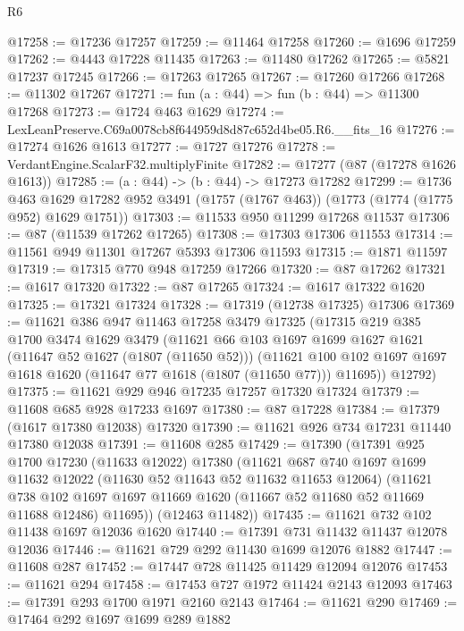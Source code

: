\begin{lexlean}{R6}
\begin{coremodule}
@17258 := @17236 @17257
@17259 := @11464 @17258
@17260 := @1696 @17259
@17262 := @4443 @17228 @11435
@17263 := @11480 @17262
@17265 := @5821 @17237 @17245
@17266 := @17263 @17265
@17267 := @17260 @17266
@17268 := @11302 @17267
@17271 := fun (a : @44) => fun (b : @44) => @11300 @17268
@17273 := @1724 @463 @1629
@17274 := LexLeanPreserve.C69a0078cb8f644959d8d87c652d4be05.R6.__fits_16
@17276 := @17274 @1626 @1613
@17277 := @1727 @17276
@17278 := VerdantEngine.ScalarF32.multiplyFinite
@17282 := @17277 (@87 (@17278 @1626 @1613))
@17285 := (a : @44) -> (b : @44) -> @17273 @17282
@17299 := @1736
    @463
    @1629
    @17282
    @952
    @3491
    (@1757 (@1767 @463))
    (@1773 (@1774 (@1775 @952) @1629 @1751))
@17303 := @11533 @950 @11299 @17268 @11537
@17306 := @87 (@11539 @17262 @17265)
@17308 := @17303 @17306 @11553
@17314 := @11561 @949 @11301 @17267 @5393 @17306 @11593
@17315 := @1871 @11597
@17319 := @17315 @770 @948 @17259 @17266
@17320 := @87 @17262
@17321 := @1617 @17320
@17322 := @87 @17265
@17324 := @1617 @17322 @1620
@17325 := @17321 @17324
@17328 := @17319 (@12738 @17325) @17306
@17369 := @11621
    @386
    @947
    @11463
    @17258
    @3479
    @17325
    (@17315
      @219
      @385
      @1700
      @3474
      @1629
      @3479
      (@11621
        @66
        @103
        @1697
        @1699
        @1627
        @1621
        (@11647 @52 @1627 (@1807 (@11650 @52)))
        (@11621 @100 @102 @1697 @1697 @1618 @1620 (@11647 @77 @1618 (@1807 (@11650 @77))) @11695))
      @12792)
@17375 := @11621 @929 @946 @17235 @17257 @17320 @17324
@17379 := @11608 @685 @928 @17233 @1697
@17380 := @87 @17228
@17384 := @17379 (@1617 @17380 @12038) @17320
@17390 := @11621 @926 @734 @17231 @11440 @17380 @12038
@17391 := @11608 @285
@17429 := @17390
    (@17391
      @925
      @1700
      @17230
      (@11633 @12022)
      @17380
      (@11621
        @687
        @740
        @1697
        @1699
        @11632
        @12022
        (@11630 @52 @11643 @52 @11632 @11653 @12064)
        (@11621
          @738
          @102
          @1697
          @1697
          @11669
          @1620
          (@11667 @52 @11680 @52 @11669 @11688 @12486)
          @11695))
      (@12463 @11482))
@17435 := @11621 @732 @102 @11438 @1697 @12036 @1620
@17440 := @17391 @731 @11432 @11437 @12078 @12036
@17446 := @11621 @729 @292 @11430 @1699 @12076 @1882
@17447 := @11608 @287
@17452 := @17447 @728 @11425 @11429 @12094 @12076
@17453 := @11621 @294
@17458 := @17453 @727 @1972 @11424 @2143 @12093
@17463 := @17391 @293 @1700 @1971 @2160 @2143
@17464 := @11621 @290
@17469 := @17464 @292 @1697 @1699 @289 @1882

\end{coremodule}
\end{lexlean}
